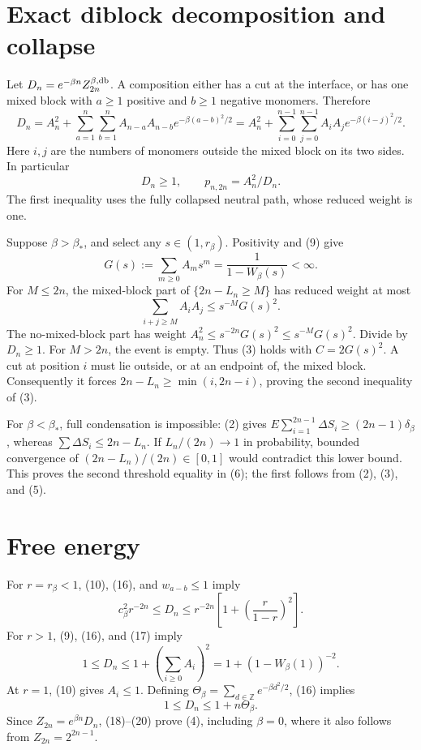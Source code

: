 \documentclass[11pt,a4paper]{report}
\begin{document}
\section{Exact diblock decomposition and collapse}

Let \(D_n=e^{-\beta n}Z_{2n}^{\beta,\rm db}\). A composition either has a cut at the interface, or has one mixed block with \(a\geq1\) positive and \(b\geq1\) negative monomers. Therefore
\[D_n=A_n^2+\sum_{a=1}^n\sum_{b=1}^n A_{n-a}A_{n-b}e^{-\beta(a-b)^2/2}
 =A_n^2+\sum_{i=0}^{n-1}\sum_{j=0}^{n-1}A_iA_j e^{-\beta(i-j)^2/2}.
 \tag{16}\]
Here \(i,j\) are the numbers of monomers outside the mixed block on its two sides. In particular
\[D_n\geq1,\qquad p_{n,2n}=A_n^2/D_n.
 \tag{17}\]
The first inequality uses the fully collapsed neutral path, whose reduced weight is one.

Suppose \(\beta>\beta_*\), and select any \(s\in(1,r_\beta)\). Positivity and (9) give
\[G(s):=\sum_{m\geq0}A_m s^m=\frac1{1-W_\beta(s)}<\infty.\]
For \(M\leq2n\), the mixed-block part of \(\{2n-L_n\geq M\}\) has reduced weight at most
\[\sum_{i+j\geq M}A_iA_j\leq s^{-M}G(s)^2.\]
The no-mixed-block part has weight \(A_n^2\leq s^{-2n}G(s)^2\leq s^{-M}G(s)^2\). Divide by \(D_n\geq1\). For \(M>2n\), the event is empty. Thus (3) holds with \(C=2G(s)^2\). A cut at position \(i\) must lie outside, or at an endpoint of, the mixed block. Consequently it forces \(2n-L_n\geq\min(i,2n-i)\), proving the second inequality of (3).

For \(\beta<\beta_*\), full condensation is impossible: (2) gives
\(E\sum_{i=1}^{2n-1}\Delta S_i\geq(2n-1)\delta_\beta\), whereas
\(\sum\Delta S_i\leq2n-L_n\). If \(L_n/(2n)\to1\) in probability, bounded convergence of \((2n-L_n)/(2n)\in[0,1]\) would contradict this lower bound. This proves the second threshold equality in (6); the first follows from (2), (3), and (5).

\section{Free energy}

For \(r=r_\beta<1\), (10), (16), and \(w_{a-b}\leq1\) imply
\[c_\beta^2 r^{-2n}\leq D_n\leq r^{-2n}\left[1+\left(\frac r{1-r}\right)^2\right].
 \tag{18}\]
For \(r>1\), (9), (16), and (17) imply
\[1\leq D_n\leq1+\left(\sum_{i\geq0}A_i\right)^2
 =1+(1-W_\beta(1))^{-2}.
 \tag{19}\]
At \(r=1\), (10) gives \(A_i\leq1\). Defining \(\Theta_\beta=\sum_{d\in\mathbb Z}e^{-\beta d^2/2}\), (16) implies
\[1\leq D_n\leq1+n\Theta_\beta.
 \tag{20}\]
Since \(Z_{2n}=e^{\beta n}D_n\), (18)--(20) prove (4), including \(\beta=0\), where it also follows from \(Z_{2n}=2^{2n-1}\).
\end{document}
